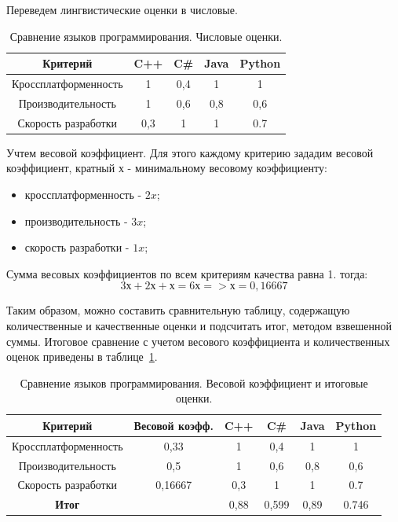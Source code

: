 Переведем лингвистические оценки в числовые.

\begin{table}[H]
	\caption{Сравнение языков программирования. Числовые оценки.}
    \centering
	\begin{tabular}{|c|c|c|c|c|}
	\hline 
	Критерий & C++ & C\# & Java & Python \\ 
	\hline 
	Кроссплатформенность  & 1 & 0,4 & 1 & 1 \\ 
	\hline 
	Производительность  & 1 & 0,6 & 0,8 & 0,6 \\ 
	\hline 
	Скорость разработки & 0,3 & 1 & 1 & 0.7 \\ 
	\hline 
	\end{tabular}     		
\end{table}

Учтем весовой коэффициент. Для этого каждому критерию зададим весовой коэффициент, кратный $х$ - минимальному весовому коэффициенту:
\begin{itemize}
\item кроссплатформенность - $2x$;
\item производительность - $3x$;
\item скорость разработки - $1x$;
\end{itemize}

Сумма весовых коэффициентов по всем критериям качества равна 1. тогда:
$$3х + 2х + х = 6х => х = 0,16667$$

Таким образом, можно составить сравнительную таблицу, содержащую количественные и качественные оценки и подсчитать итог, методом взвешенной суммы.
Итоговое сравнение с учетом весового коэффициента и количественных оценок приведены в таблице~\ref{tab:PLitog}.


\begin{table}[!htb]
	\caption{Сравнение языков программирования. Весовой коэффициент и итоговые оценки.}\label{tab:PLitog}
    \centering
	\begin{tabular}{|c|c|c|c|c|c|}
	\hline 
	Критерий & Весовой коэфф. & C++ & C\# & Java & Python \\ 
	\hline 
	Кроссплатформенность & 0,33 & 1 & 0,4 & 1 & 1 \\ 
	\hline 
	Производительность & 0,5 & 1 & 0,6 & 0,8 & 0,6 \\ 
	\hline 
	Скорость разработки  & 0,16667 & 0,3 & 1 & 1 & 0.7 \\ 
	\hline 
	\textbf{Итог}  &  & 0,88 & 0,599 & 0,89 & 0.746 \\ 
	\hline
	\end{tabular}     		
\end{table}




